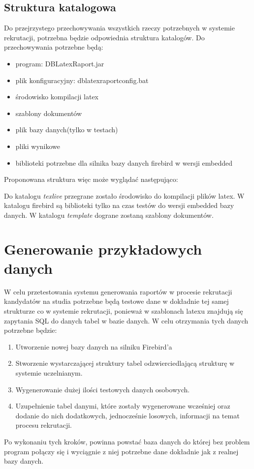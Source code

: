 \subsection{Struktura katalogowa}

Do przejrzystego przechowywania wszystkich rzeczy potrzebnych w systemie rekrutacji, potrzebna będzie odpowiednia struktura katalogów. Do przechowywania potrzebne będą: \\
\begin{itemize}
\item program: DBLatexRaport.jar
\item plik konfiguracyjny: dblatexraportconfig.bat
\item środowisko kompilacji latex
\item szablony dokumentów 
\item plik bazy danych(tylko w testach)
\item pliki wynikowe
\item biblioteki potrzebne dla silnika bazy danych firebird w wersji embedded \\
\end{itemize}

Proponowana struktura więc może wyglądać następująco:

\vspace{5mm}
Do katalogu \emph{texlive} przegrane zostało środowisko do kompilacji plików latex. W katalogu firebird są biblioteki tylko na czas testów do wersji embedded bazy danych. W katalogu \emph{template} dograne zostaną szablony dokumentów.


\section{ Generowanie przykładowych danych}

W celu przetestowania systemu generowania raportów w procesie rekrutacji kandydatów na studia potrzebne będą testowe dane w dokładnie tej samej strukturze co w systemie rekrutacji, ponieważ w szablonach latexu znajdują się zapytania SQL do danych tabel w bazie danych. 
W celu otrzymania tych danych potrzebne będzie:
\begin{enumerate}

\item	Utworzenie nowej bazy danych na silniku Firebird’a 
\item	Stworzenie wystarczającej struktury tabel odzwierciedlającą strukturę w systemie uczelnianym.
\item	Wygenerowanie dużej ilości testowych danych osobowych.
\item	Uzupełnienie tabel danymi, które zostały wygenerowane wcześniej oraz dodanie do nich dodatkowych, jednocześnie losowych, informacji na temat procesu rekrutacji.
\vspace{5mm}
\end{enumerate}
Po wykonaniu tych kroków, powinna powstać baza danych do której bez problem program połączy się i wyciągnie z niej potrzebne dane dokładnie jak z realnej bazy danych.


